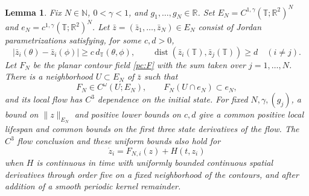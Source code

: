 \documentclass[11pt]{amsart}
\newtheorem{lemma}[theorem]{Lemma}
\theoremstyle{remark}
\numberwithin{equation}{section}
\newcommand{\R}{\mathbb R}
\newcommand{\T}{\mathbb T}
\begin{document}
\begin{lemma}
\label{np:local-general}
Fix $N\in\mathbb N$, $0<\gamma<1$, and $g_1,\ldots,g_N\in\R$.
Set $E_N=C^{1,\gamma}(\T;\R^2)^N$ and
$e_N=c^{1,\gamma}(\T;\R^2)^N$. Let
$\bar z=(\bar z_1,\ldots,\bar z_N)\in E_N$ consist of Jordan
parametrizations satisfying, for some $c,d>0$,
\[
 |\bar z_i(\theta)-\bar z_i(\phi)|
       \ge c\,d_\T(\theta,\phi),\qquad
 \operatorname{dist}(\bar z_i(\T),\bar z_j(\T))\ge d\quad(i\ne j).
\]
Let $F_N$ be the planar contour field \eqref{pc:F} with the sum
taken over $j=1,\ldots,N$. There is a neighborhood $U\subset E_N$
of $\bar z$ such that
\[
 F_N\in C^\omega(U;E_N),\qquad F_N(U\cap e_N)\subset e_N,
\]
and its local flow has $C^3$ dependence on the initial state.
For fixed $N,\gamma,(g_j)$, a bound on $\|z\|_{E_N}$ and positive
lower bounds on $c,d$ give a common positive local lifespan and
common bounds on the first three state derivatives of the flow.
The $C^3$ flow conclusion and these uniform bounds also hold for
\[
 \dot z_i=F_{N,i}(z)+H(t,z_i)
\]
when $H$ is continuous in time with uniformly bounded continuous
spatial derivatives through order five on a fixed neighborhood of
the contours, and after addition of a smooth periodic kernel remainder.
\end{lemma}
\end{document}
